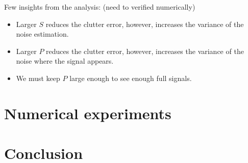 \documentclass[journal]{IEEEtran}
\numberwithin{equation}{section}
\numberwithin{figure}{section}
\theoremstyle{plain}
\theoremstyle{definition}
\theoremstyle{remark}
\theoremstyle{plain}
\theoremstyle{remark}
\theoremstyle{plain}
\theoremstyle{plain}
\begin{document}
Few insights from the analysis: (need to verified numerically)
\begin{itemize}
	\item Larger $S$ reduces the clutter error, however, increases the variance of the noise estimation.
	\item Larger $P$ reduces the clutter error, however, increases the variance of the noise  where the signal appears.
	\item We must keep $P$ large enough to see enough full signals.    
\end{itemize} 


\section{Numerical experiments} \label{sec:experiments}

\section{Conclusion} \label{sec:conclusion}






\end{document}
